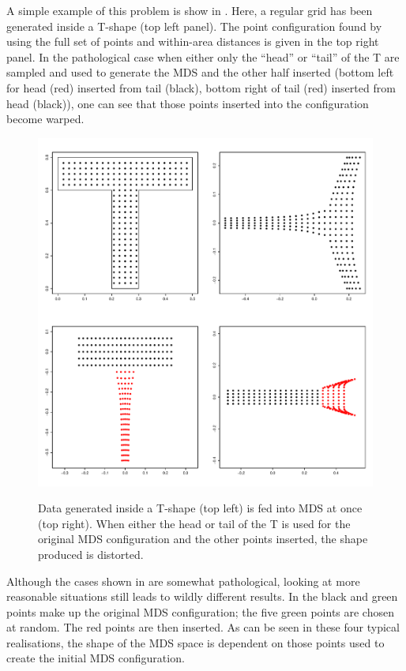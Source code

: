 A simple example of this problem is show in . Here, a regular grid has been generated inside a T-shape (top left panel). The point configuration found by using the full set of points and within-area distances is given in the top right panel. In the pathological case when either only the ``head'' or ``tail'' of the T are sampled and used to generate the MDS and the other half inserted (bottom left for head (red) inserted from tail (black), bottom right of tail (red) inserted from head (black)), one can see that those points inserted into the configuration become warped. 

\begin{figure}
\centering
\includegraphics[width=6in]{mds/figs/tshape.pdf} \\
\caption{Data generated inside a T-shape (top left) is fed into MDS at once (top right). When either the head or tail of the T is used for the original MDS configuration and the other points inserted, the shape produced is distorted.}
\label{tshape}
\end{figure}

Although the cases shown in  are somewhat pathological, looking at more reasonable situations still leads to wildly different results. In  the black and green points make up the original MDS configuration; the five green points are chosen at random. The red points are then inserted. As can be seen in these four typical realisations, the shape of the MDS space is dependent on those points used to create the initial MDS configuration.

